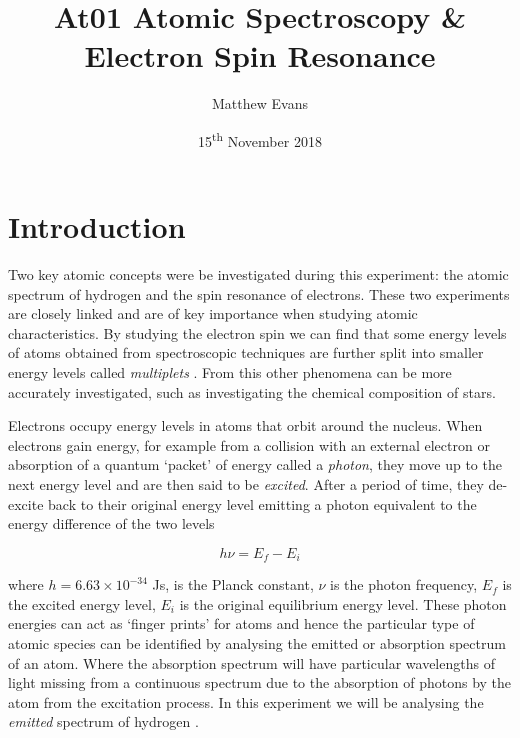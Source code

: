 \documentclass{article}
\begin{document}
\title{At01 Atomic Spectroscopy \& Electron Spin Resonance} %
\author{Matthew Evans}%
\date{15\textsuperscript{th} November 2018} %
\maketitle %



\section{Introduction}
\label{sec:introduction}

Two key atomic concepts were be investigated during this experiment: the atomic spectrum of hydrogen and the spin resonance of electrons. These two experiments are closely linked and are of key importance when studying atomic characteristics. By studying the electron spin we can find that some energy levels of atoms obtained from spectroscopic techniques are further split into smaller energy levels called \textit{multiplets} \cite{Book01}. From this other phenomena can be more accurately investigated, such as investigating the chemical composition of stars. 

\vspace{2mm}
\noindent
Electrons occupy energy levels in atoms that orbit around the nucleus. When electrons gain energy, for example from a collision with an external electron or absorption of a quantum  `packet' of energy called a \textit{photon}, they move up to the next energy level and are then said to be \textit{excited}. After a  period of time, they de-excite back to their original energy level emitting a photon equivalent to the energy difference of the two levels 

\begin{equation}
\label{eq:energy-diff}
h \nu = E_f - E_i
\end{equation}

\vspace{2mm}
\noindent
where $h = 6.63 \times 10^{-34}$ Js, is the Planck constant, $\nu$ is the photon frequency, $E_f$ is the excited energy level, $E_i$ is the original equilibrium energy level. These photon energies can act as `finger prints' for atoms and hence the particular type of atomic species can be identified by analysing the emitted or absorption spectrum of an atom. Where the absorption spectrum will have particular wavelengths of light missing from a continuous spectrum due to the absorption of photons by the atom from the excitation process. 
In this experiment we will be analysing the \textit{emitted} spectrum of hydrogen \cite{Paper01}.
\end{document}
